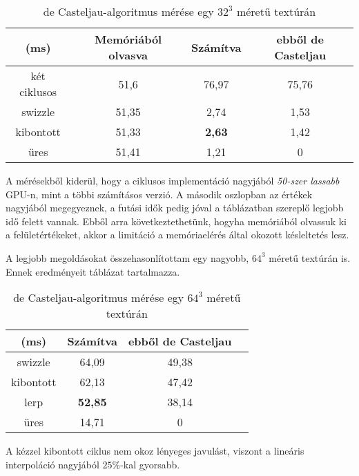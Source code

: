 \begin{table}[H]
	\begin{center}
		\begin{tabular}{| c || c || c | c |}
			\hline
			(ms) & \textbf{Memóriából olvasva} & \textbf{Számítva} & \textbf{ebből de Casteljau} \\ 
			\hline\hline
			két ciklusos & 51,6 & 76,97	& 75,76 \\
			\hline
			swizzle	& 51,35	& 2,74 & 1,53 \\
			\hline
			kibontott & 51,33 & \textbf{2,63} & 1,42 \\
			\hline
			üres & 51,41 & 1,21	& 0 \\
			\hline
		\end{tabular}
	\end{center}
	\caption{de Casteljau-algoritmus mérése egy $32^3$ méretű textúrán}
	\label{tab:deCasteljau}
\end{table}

A mérésekből kiderül, hogy a ciklusos implementáció nagyjából \emph{50-szer lassabb} GPU-n, mint a többi számításos verzió. A második oszlopban az értékek nagyjából megegyeznek, a futási idők pedig jóval a táblázatban szereplő legjobb idő felett vannak. Ebből arra következtethetünk, hogyha memóriából olvassuk ki a felületértékeket, akkor a limitáció a memóriaelérés által okozott késleltetés lesz.

A legjobb megoldásokat összehasonlítottam egy nagyobb, $64^3$ méretű textúrán is. Ennek eredményeit  táblázat tartalmazza.

\begin{table}[H]
	\begin{center}
		\begin{tabular}{| c || c || c | c |}
			\hline
			(ms) & \textbf{Számítva} & \textbf{ebből de Casteljau} \\ 
			\hline\hline
			swizzle & 64,09 & 49,38 \\
			\hline
			kibontott & 62,13 & 47,42 \\
			\hline
			lerp & \textbf{52,85} & 38,14 \\
			\hline
			üres & 14,71 & 0 \\
			\hline
		\end{tabular}
	\end{center}
	\caption{de Casteljau-algoritmus mérése egy $64^3$ méretű textúrán}
	\label{tab:deCasteljau2}
\end{table}

A kézzel kibontott ciklus nem okoz lényeges javulást, viszont a lineáris interpoláció nagyjából $25\%$-kal gyorsabb. 


